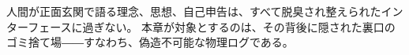 \noindent
人間が正面玄関で語る理念、思想、自己申告は、すべて脱臭され整えられたインターフェースに過ぎない。
本章が対象とするのは、その背後に隠された裏口のゴミ捨て場――すなわち、偽造不可能な物理ログである。

